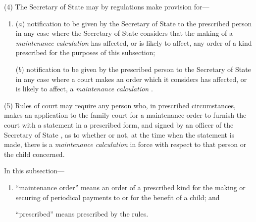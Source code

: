 \documentclass[12pt,a4paper]{article}
\begin{document}
(4) The Secretary of State may by regulations make provision for—
\begin{enumerate}\item[]
($a$) notification to be given by 
the 
Secretary of State  %
to the prescribed person in any case where 
the Secretary of State  %
considers that the making of a 
\emph{maintenance calculation}  %
has affected, or is likely to affect, any order of a kind prescribed for the purposes of this subsection;

($b$) notification to be given by the prescribed person to the 
Secretary of State  %
in any case where a court makes an order which it considers has affected, or is likely to affect, a 
\emph{maintenance calculation}%
.
\end{enumerate}

(5) Rules 
of court may require  %
any person who, in prescribed circumstances, makes an application to 
the family court  %
for a maintenance order to furnish the court with a statement in a prescribed form, and signed by 
an officer of the 
Secretary of State%
, as to whether or not, at the time when the statement is made, there is a 
\emph{maintenance calculation}  %
in force with respect to that person or the child concerned.

In this subsection—
\begin{enumerate}\item[]
    “maintenance order” means an order of a prescribed kind for the making or securing of periodical payments to or for the benefit of a child; and

    “prescribed” means prescribed by the rules. 
\end{enumerate}
\end{document}
